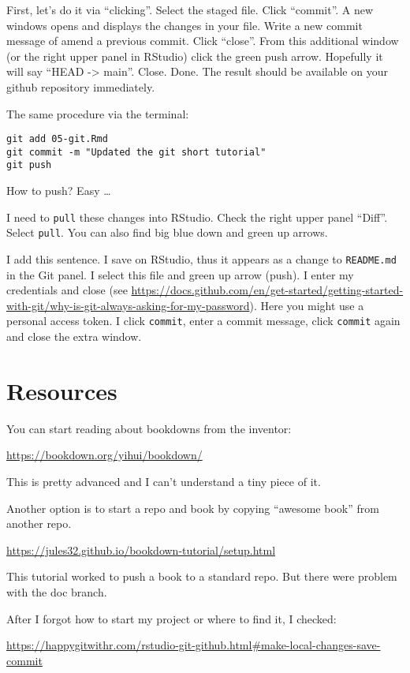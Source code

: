 \documentclass[
]{book}
\begin{document}
First, let's do it via ``clicking''. Select the staged file. Click ``commit''. A new windows opens and displays the changes in your file. Write a new commit message of amend a previous commit. Click ``close''. From this additional window (or the right upper panel in RStudio) click the green push arrow. Hopefully it will say ``HEAD -\textgreater{} main''. Close. Done. The result should be available on your github repository immediately.

The same procedure via the terminal:

\begin{verbatim}
git add 05-git.Rmd
git commit -m "Updated the git short tutorial"
git push 
\end{verbatim}

How to push? Easy \ldots{}

I need to \texttt{pull} these changes into RStudio. Check the right upper panel ``Diff''. Select \texttt{pull}. You can also find big blue down and green up arrows.

I add this sentence. I save on RStudio, thus it appears as a change to \texttt{README.md} in the Git panel. I select this file and green up arrow (push). I enter my credentials and close (see \url{https://docs.github.com/en/get-started/getting-started-with-git/why-is-git-always-asking-for-my-password}). Here you might use a personal access token. I click \texttt{commit}, enter a commit message, click \texttt{commit} again and close the extra window.

\hypertarget{resources}{%
\section{Resources}\label{resources}}

You can start reading about bookdowns from the inventor:

\url{https://bookdown.org/yihui/bookdown/}

This is pretty advanced and I can't understand a tiny piece of it.

Another option is to start a repo and book by copying ``awesome book'' from another repo.

\url{https://jules32.github.io/bookdown-tutorial/setup.html}

This tutorial worked to push a book to a standard repo. But there were problem with the doc branch.

After I forgot how to start my project or where to find it, I checked:

\url{https://happygitwithr.com/rstudio-git-github.html\#make-local-changes-save-commit}
\end{document}
